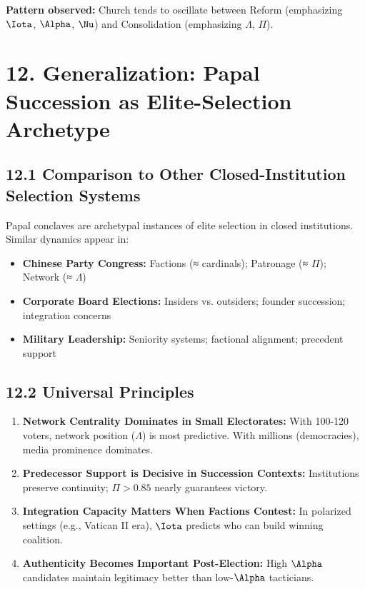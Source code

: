 \textbf{Pattern observed:} Church tends to oscillate between Reform (emphasizing $\Iota$, $\Alpha$, $\Nu$) and Consolidation (emphasizing $\Lambda$, $\Pi$).

\section{12. Generalization: Papal Succession as Elite-Selection Archetype}

\subsection{12.1 Comparison to Other Closed-Institution Selection Systems}

Papal conclaves are archetypal instances of elite selection in closed institutions. Similar dynamics appear in:

\begin{itemize}
\item \textbf{Chinese Party Congress:} Factions (≈ cardinals); Patronage (≈ $\Pi$); Network (≈ $\Lambda$)
\item \textbf{Corporate Board Elections:} Insiders vs. outsiders; founder succession; integration concerns
\item \textbf{Military Leadership:} Seniority systems; factional alignment; precedent support
\end{itemize}

\subsection{12.2 Universal Principles}

\begin{enumerate}
\item \textbf{Network Centrality Dominates in Small Electorates:} With 100-120 voters, network position ($\Lambda$) is most predictive. With millions (democracies), media prominence dominates.

\item \textbf{Predecessor Support is Decisive in Succession Contexts:} Institutions preserve continuity; $\Pi > 0.85$ nearly guarantees victory.

\item \textbf{Integration Capacity Matters When Factions Contest:} In polarized settings (e.g., Vatican II era), $\Iota$ predicts who can build winning coalition.

\item \textbf{Authenticity Becomes Important Post-Election:} High $\Alpha$ candidates maintain legitimacy better than low-$\Alpha$ tacticians.

\end{enumerate}

